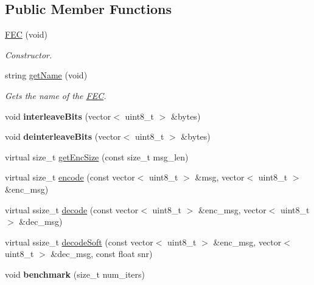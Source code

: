 \subsection*{Public Member Functions}
\begin{DoxyCompactItemize}
\item 
\mbox{\label{classFEC_acff6b0b2b7266f73c45eeea65b7579f2}} 
\hyperlink{classFEC_acff6b0b2b7266f73c45eeea65b7579f2}{F\+EC} (void)
\begin{DoxyCompactList}\small\item\em Constructor. \end{DoxyCompactList}\item 
\mbox{\label{classFEC_afd2e56aa5a55ba34dc52e01a221c1350}} 
string \hyperlink{classFEC_afd2e56aa5a55ba34dc52e01a221c1350}{get\+Name} (void)
\begin{DoxyCompactList}\small\item\em Gets the name of the \hyperlink{classFEC}{F\+EC}. \end{DoxyCompactList}\item 
\mbox{\label{classFEC_a412f924c0a2486c9ada8f0ce751bf707}} 
void {\bfseries interleave\+Bits} (vector$<$ uint8\+\_\+t $>$ \&bytes)
\item 
\mbox{\label{classFEC_a05559ebcd5b4b3b05d8a92aa2954ff52}} 
void {\bfseries deinterleave\+Bits} (vector$<$ uint8\+\_\+t $>$ \&bytes)
\item 
virtual size\+\_\+t \hyperlink{classFEC_a6504a5f7d5e1344538c25ed5481d0adb}{get\+Enc\+Size} (const size\+\_\+t msg\+\_\+len)
\item 
virtual size\+\_\+t \hyperlink{classFEC_abc86f45390c50b3cd90cade73a137355}{encode} (const vector$<$ uint8\+\_\+t $>$ \&msg, vector$<$ uint8\+\_\+t $>$ \&enc\+\_\+msg)
\item 
virtual ssize\+\_\+t \hyperlink{classFEC_aec87f2d9c2305283d226197bf76891cf}{decode} (const vector$<$ uint8\+\_\+t $>$ \&enc\+\_\+msg, vector$<$ uint8\+\_\+t $>$ \&dec\+\_\+msg)
\item 
virtual ssize\+\_\+t \hyperlink{classFEC_a04ba63e1dac24bed00f448f9198e34b5}{decode\+Soft} (const vector$<$ uint8\+\_\+t $>$ \&enc\+\_\+msg, vector$<$ uint8\+\_\+t $>$ \&dec\+\_\+msg, const float snr)
\item 
\mbox{\label{classFEC_aaccc10a6d38eb005f1f287119bdaecd8}} 
void {\bfseries benchmark} (size\+\_\+t num\+\_\+iters)
\end{DoxyCompactItemize}
